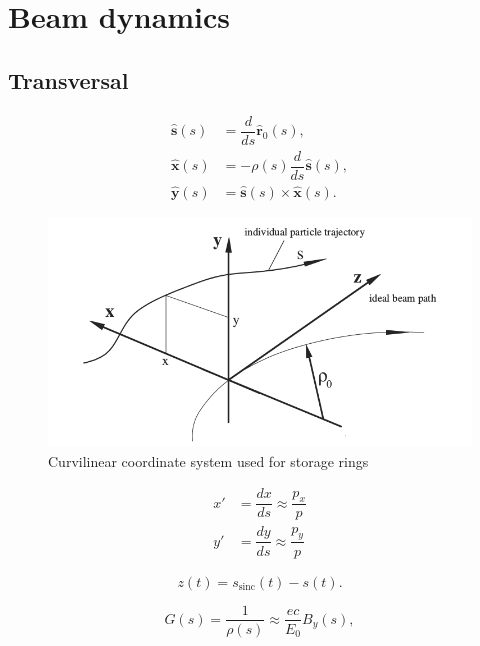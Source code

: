 \chapter{Beam dynamics}

\section{Transversal}


\begin{align}
    \mathbf{\hat{s}}(s) & = \dfrac{d}{ds}\mathbf{\hat{r}}_0 (s), \nonumber \\
     \mathbf{\hat{x}}(s) & = -\rho(s)\dfrac{d}{ds}\mathbf{\hat{s}} (s), \\
      \mathbf{\hat{y}}(s) & = \mathbf{\hat{s}}(s) \times \mathbf{\hat{x}}(s). \nonumber 
\end{align}


\begin{figure}
    \centering
    \includegraphics[scale=0.5]{figures/coordinate.png}
    \caption{Curvilinear coordinate system used for storage rings \cite{wiedemann2007physics}}
    \label{sist}
\end{figure}



\begin{align}
    x' & = \dfrac{dx}{ds} \approx  \dfrac{p_x}{p} \nonumber \\
      y' & = \dfrac{dy}{ds} \approx  \dfrac{p_y}{p} \nonumber
\end{align}



\[
z(t) = s_{\text{sinc}}(t) - s(t).
\]



\begin{equation}
    G(s) = \dfrac{1}{\rho(s)} \approx \dfrac{ec}{E_0}B_{y}(s),
\end{equation}



